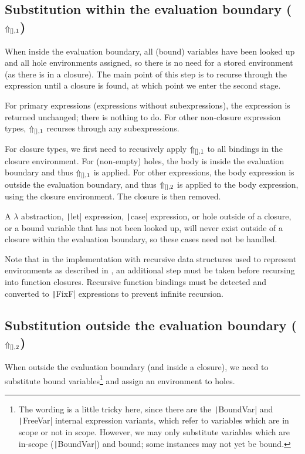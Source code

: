 \subsection{Substitution within the evaluation boundary ($\Uparrow_{[],1}$)}
\label{sec:postprocessing-subst-inside}

When inside the evaluation boundary, all (bound) variables have been looked up and all hole environments assigned, so there is no need for a stored environment (as there is in a closure). The main point of this step is to recurse through the expression until a closure is found, at which point we enter the second stage.

For primary expressions (expressions without subexpressions), the expression is returned unchanged; there is nothing to do. For other non-closure expression types, $\Uparrow_{[],1}$ recurses through any subexpressions.

For closure types, we first need to recusively apply $\Uparrow_{[],1}$ to all bindings in the closure environment. For (non-empty) holes, the body is inside the evaluation boundary and thus $\Uparrow_{[],1}$ is applied. For other expressions, the body expression is outside the evaluation boundary, and thus $\Uparrow_{[],2}$ is applied to the body expression, using the closure environment. The closure is then removed.

A $\lambda$ abstraction, \texttt|let| expression, \texttt|case| expression, or hole outside of a closure, or a bound variable that has not been looked up, will never exist outside of a closure within the evaluation boundary, so these cases need not be handled.

Note that in the implementation with recursive data structures used to represent environments as described in , an additional step must be taken before recursing into function closures. Recursive function bindings must be detected and converted to \texttt|FixF| expressions to prevent infinite recursion.


\subsection{Substitution outside the evaluation boundary ($\Uparrow_{[],2}$)}
\label{sec:postprocessing-subst-outside}

When outside the evaluation boundary (and inside a closure), we need to substitute bound variables\footnote{The wording is a little tricky here, since there are the \texttt|BoundVar| and \texttt|FreeVar| internal expression variants, which refer to variables which are in scope or not in scope. However, we may only substitute variables which are in-scope (\texttt|BoundVar|) and bound; some instances may not yet be bound.} and assign an environment to holes.


